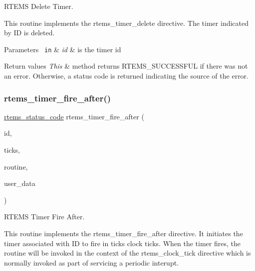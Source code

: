 R\+T\+E\+MS Delete Timer. 

This routine implements the rtems\+\_\+timer\+\_\+delete directive. The timer indicated by ID is deleted.


\begin{DoxyParams}[1]{Parameters}
\mbox{\texttt{ in}}  & {\em id} & is the timer id\\
\hline
\end{DoxyParams}

\begin{DoxyRetVals}{Return values}
{\em This} & method returns R\+T\+E\+M\+S\+\_\+\+S\+U\+C\+C\+E\+S\+S\+F\+UL if there was not an error. Otherwise, a status code is returned indicating the source of the error. \\
\hline
\end{DoxyRetVals}
\mbox{\label{group__ClassicTimer_gad9785a6bd78ab5a591a134d147b2bdd3}} 
\subsubsection{\texorpdfstring{rtems\_timer\_fire\_after()}{rtems\_timer\_fire\_after()}}
{\footnotesize\ttfamily \mbox{\hyperlink{group__ClassicStatus_ga545d41846817eaba6143d52ee4d9e9fe}{rtems\+\_\+status\+\_\+code}} rtems\+\_\+timer\+\_\+fire\+\_\+after (\begin{DoxyParamCaption}\item[{\mbox{\hyperlink{group__ClassicTasks_gab20892b814dced7dd4e5b9bf42becd57}{rtems\+\_\+id}}}]{id,  }\item[{\mbox{\hyperlink{group__ClassicTasks_gad39c43f949683d46874e3a5586b93aee}{rtems\+\_\+interval}}}]{ticks,  }\item[{\mbox{\hyperlink{group__ClassicTimer_gab7851346dd520066ddc58a25de671f51}{rtems\+\_\+timer\+\_\+service\+\_\+routine\+\_\+entry}}}]{routine,  }\item[{void $\ast$}]{user\+\_\+data }\end{DoxyParamCaption})}



R\+T\+E\+MS Timer Fire After. 

This routine implements the rtems\+\_\+timer\+\_\+fire\+\_\+after directive. It initiates the timer associated with ID to fire in ticks clock ticks. When the timer fires, the routine will be invoked in the context of the rtems\+\_\+clock\+\_\+tick directive which is normally invoked as part of servicing a periodic interupt.


